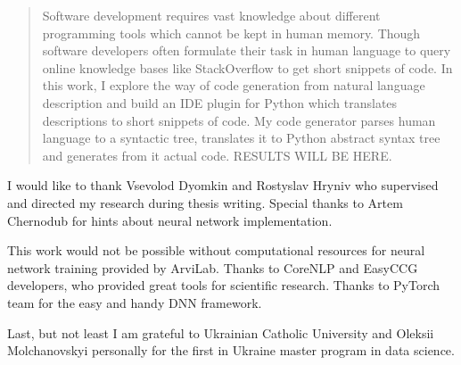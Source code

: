 \documentclass[
12pt, %
oneside, %
english, %
onehalfspacing, %
nolistspacing, %
liststotoc, %
parskip, %
headsepline, %
]{MastersDoctoralThesis} %
\begin{document}
\cleardoublepage




\begin{abstract}
\addchaptertocentry{\abstractname} %
Software development requires vast knowledge about different programming tools which cannot be kept in human memory. Though software developers often formulate their task in human language to query online knowledge bases like StackOverflow to get short snippets of code. In this work, I explore the way of code generation from natural language description and build an IDE plugin for Python which translates descriptions to short snippets of code. My code generator parses human language to a syntactic tree, translates it to Python abstract syntax tree and generates from it actual code. RESULTS WILL BE HERE.
\end{abstract}


\begin{acknowledgements}
\addchaptertocentry{\acknowledgementname} %
I would like to thank Vsevolod Dyomkin and Rostyslav Hryniv who supervised and directed my research during thesis writing. Special thanks to Artem Chernodub for hints about neural network implementation.

This work would not be possible without computational resources for neural network training provided by ArviLab. Thanks to CoreNLP and EasyCCG developers, who provided great tools for scientific research. Thanks to PyTorch team for the easy and handy DNN framework.

Last, but not least I am grateful to Ukrainian Catholic University and Oleksii Molchanovskyi personally for the first in Ukraine master program in data science.
\end{acknowledgements}

\end{document}
